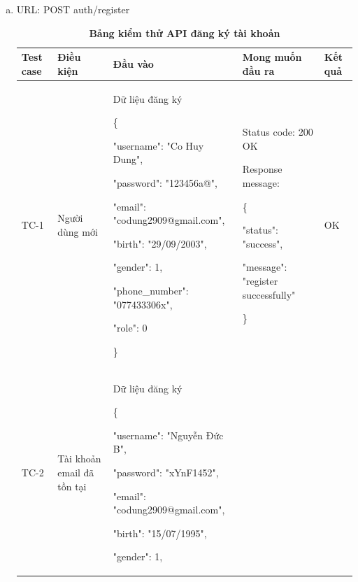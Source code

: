 \begin{enumerate}[a)]
  \item URL: POST auth/register
  
  \break
  \begin{xltabular}{\textwidth}{
    | >{\raggedright\arraybackslash}p{1cm}
    | >{\raggedright\arraybackslash}p{2.5cm}
    | >{\raggedright\arraybackslash}X
    | >{\raggedright\arraybackslash}X
    | >{\raggedright\arraybackslash}p{1cm}|
    }
    \caption{\bfseries \fontsize{12pt}{0pt}\selectfont Bảng kiểm thử API đăng ký tài khoản}
    \\
    \hline
    \bfseries Test case    &\bfseries Điều kiện   &\bfseries Đầu vào 
    &\bfseries Mong muốn đầu ra &\bfseries Kết quả\\ \hline
  
  
    TC-1
    & Người dùng mới
    & Dữ liệu đăng ký

    \{

    "username": "Co Huy Dung",

    "password": "123456a@",

    "email": "codung2909@gmail.com",

    "birth": "29/09/2003",

    "gender": 1,

    "phone\_number": "077433306x",

    "role": 0

   \}
  
    & 
  
    Status code: 200 OK
  
      Response message:
  
      \{
  
    "status": "success",
  
    "message": "register successfully"
  
    \}
    
    & OK
  
    \\ \hline
  
    TC-2
    & Tài khoản email đã tồn tại
    & Dữ liệu đăng ký 

    \{

    "username": "Nguyễn Đức B",

    "password": "xYnF1452",

    "email": "codung2909@gmail.com",

    "birth": "15/07/1995",

    "gender": 1,


\end{xltabular}
\end{enumerate}
